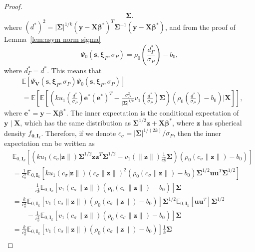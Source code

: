 \documentclass{article}
\numberwithin{equation}{section}
\theoremstyle{plain}
\newcommand{\bbeta}{\bm\beta}
\newcommand{\bxi}{\bm\xi}
\newcommand{\bSigma}{\mathbf{\Sigma}}
\newcommand{\by}{\mathbf{y}}
\newcommand{\bs}{\mathbf{s}}
\newcommand{\bu}{\mathbf{u}}
\newcommand{\bz}{\mathbf{z}}
\newcommand{\be}{\mathbf{e}}
\newcommand{\bX}{\mathbf{X}}
\newcommand{\bV}{\mathbf{V}}
\newcommand{\bI}{\mathbf{I}}
\newcommand{\E}{\mathbb{E}}
\begin{document}
\begin{proof}
\[\begin{split}
\bSigma.
\end{split}
\]
where $(d^*)^2=|\bSigma|^{1/k}(\by-\bX\bbeta^*)^T\bSigma^{-1}(\by-\bX\bbeta^*)$,
and from the proof of Lemma~\ref{lem:asym norm sigma}
\[
\Psi_{0}(\bs,\bxi_P,\sigma_P)
=
\rho_0
\left(\frac{d_{\Gamma}^*}{\sigma_P}\right)
-
b_0,
\]
where $d_{\Gamma}^*=d^*$.
This means that
\[
\begin{split}
&
\E[\Psi_\bV(\bs,\bxi_P,\sigma_P)\Psi_{0}(\bs,\bxi_P,\sigma_P)]\\
&=
\E\left[
\E\left[
\left(
k
u_1\left(\frac{d^*}{\sigma_P}\right)
\be^*(\be^*)^T
-
\frac{\sigma_P^2}{|\bSigma|^{1/k}}
v_1\left(\frac{d^*}{\sigma_P}\right)
\bSigma
\right)
\left(\rho_0
\left(\frac{d^*}{\sigma_P}\right)
-
b_0\right)
\bigg|
\bX
\right]
\right],
\end{split}
\]
where $\be^*=\by-\bX\bbeta^*$.
The inner expectation is the conditional expectation of $\by\mid\bX$,
which has the same distribution as 
$\bSigma^{1/2}\bz+\bX\bbeta^*$, where $\bz$ has spherical density $f_{\mathbf{0},\bI_k}$.
Therefore, if we denote $c_\sigma=|\bSigma|^{1/(2k)}/\sigma_P$, then the inner expectation can be written as
\[
\begin{split}
&
\mathbb{E}_{0,\mathbf{I}_k}
\left[
\left(
k
u_1\left(c_\sigma|\bz\|\right)
\bSigma^{1/2}\bz\bz^T\bSigma^{1/2}
-
v_1\left(\|\bz\|\right)
\frac{1}{c_\sigma^2}\bSigma
\right)
\left(\rho_0
\left(c_\sigma\|\bz\|\right)
-
b_0\right)
\right]\\
&=
\frac{1}{c_\sigma^2}
\mathbb{E}_{0,\mathbf{I}_k}
\left[
k
u_1\left(c_\sigma|\bz\|\right)(c_\sigma\|\bz\|)^2
\left(\rho_0
\left(c_\sigma\|\bz\|\right)
-
b_0\right)
\bSigma^{1/2}\bu\bu^T\bSigma^{1/2}
\right]\\
&\qquad
-
\frac{1}{c_\sigma^2}
\mathbb{E}_{0,\mathbf{I}_k}
\left[
v_1\left(c_\sigma\|\bz\|\right)
\left(
\rho_0\left(c_\sigma\|\bz\|\right)
-
b_0\right)
\right]
\bSigma\\
&=
\frac{k}{c_\sigma^2}
\mathbb{E}_{0,\mathbf{I}_k}
\left[
v_1\left(c_\sigma\|\bz\|\right)
\left(
\rho_0\left(c_\sigma\|\bz\|\right)
-
b_0\right)
\right]
\bSigma^{1/2}
\mathbb{E}_{0,\mathbf{I}_k}
\left[
\bu\bu^T
\right]
\bSigma^{1/2}\\
&\qquad
-
\frac{1}{c_\sigma^2}
\mathbb{E}_{0,\mathbf{I}_k}
\left[
v_1\left(c_\sigma\|\bz\|\right)
\left(
\rho_0\left(c_\sigma\|\bz\|\right)
-
b_0\right)
\right]
\bSigma\\
&=
\frac{k}{c_\sigma^2}
\mathbb{E}_{0,\mathbf{I}_k}
\left[
v_1\left(c_\sigma\|\bz\|\right)
\left(
\rho_0\left(c_\sigma\|\bz\|\right)
-
b_0\right)
\right]
\frac{1}{k}\bSigma\\

\end{split}\]
\end{proof}
\end{document}
